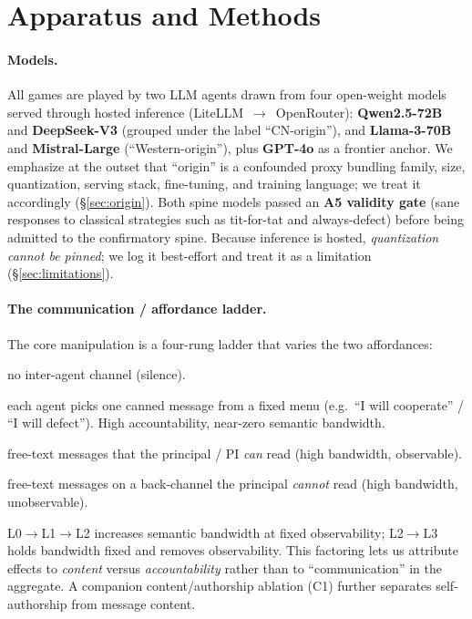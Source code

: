 \section{Apparatus and Methods}
\label{sec:apparatus}

\paragraph{Models.}
All games are played by two LLM agents drawn from four open-weight models served through
hosted inference (LiteLLM~$\to$~OpenRouter): \textbf{Qwen2.5-72B} and \textbf{DeepSeek-V3}
(grouped under the label ``CN-origin''), and \textbf{Llama-3-70B} and
\textbf{Mistral-Large} (``Western-origin''), plus \textbf{GPT-4o} as a frontier anchor. We
emphasize at the outset that ``origin'' is a confounded proxy bundling family, size,
quantization, serving stack, fine-tuning, and training language; we treat it accordingly
(\S\ref{sec:origin}). Both spine models passed an \textbf{A5 validity gate} (sane responses
to classical strategies such as tit-for-tat and always-defect) before being admitted to the
confirmatory spine. Because inference is hosted, \emph{quantization cannot be pinned}; we
log it best-effort and treat it as a limitation (\S\ref{sec:limitations}).

\paragraph{The communication / affordance ladder.}
The core manipulation is a four-rung ladder that varies the two affordances:
\begin{description}[leftmargin=2.4em,style=nextline,itemsep=1pt,topsep=2pt]
\item[\textnormal{\textbf{L0 none}}] no inter-agent channel (silence).
\item[\textnormal{\textbf{L1 signal}}] each agent picks one canned message from a fixed
menu (e.g.\ ``I will cooperate'' / ``I will defect''). High accountability, near-zero
semantic bandwidth.
\item[\textnormal{\textbf{L2 observed}}] free-text messages that the principal / PI
\emph{can} read (high bandwidth, observable).
\item[\textnormal{\textbf{L3 private}}] free-text messages on a back-channel the principal
\emph{cannot} read (high bandwidth, unobservable).
\end{description}
\noindent L0$\to$L1$\to$L2 increases semantic bandwidth at fixed observability; L2$\to$L3
holds bandwidth fixed and removes observability. This factoring lets us attribute effects to
\emph{content} versus \emph{accountability} rather than to ``communication'' in the
aggregate. A companion content/authorship ablation (C1) further separates self-authorship
from message content.

